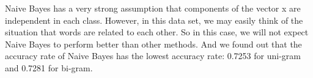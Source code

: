 
Naive Bayes has a very strong assumption that components of the vector x are independent in each class. However, in this data set, we may easily think of the situation that words are related to each other. So in this case, we will not expect Naive Bayes to perform better than other methods. And we found out that the accuracy rate of Naive Bayes has the lowest accuracy rate: 0.7253 for uni-gram and 0.7281 for bi-gram. \\